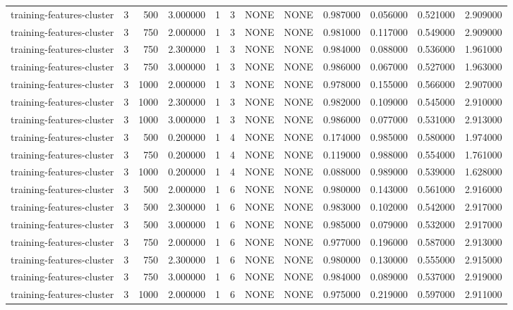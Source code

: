 \begin{tabular}{lrrrllllrrrr}
training-features-cluster & 3 & 500 & 3.000000 & 1 & 3 & NONE & NONE & 0.987000 & 0.056000 & 0.521000 & 2.909000 \\
training-features-cluster & 3 & 750 & 2.000000 & 1 & 3 & NONE & NONE & 0.981000 & 0.117000 & 0.549000 & 2.909000 \\
training-features-cluster & 3 & 750 & 2.300000 & 1 & 3 & NONE & NONE & 0.984000 & 0.088000 & 0.536000 & 1.961000 \\
training-features-cluster & 3 & 750 & 3.000000 & 1 & 3 & NONE & NONE & 0.986000 & 0.067000 & 0.527000 & 1.963000 \\
training-features-cluster & 3 & 1000 & 2.000000 & 1 & 3 & NONE & NONE & 0.978000 & 0.155000 & 0.566000 & 2.907000 \\
training-features-cluster & 3 & 1000 & 2.300000 & 1 & 3 & NONE & NONE & 0.982000 & 0.109000 & 0.545000 & 2.910000 \\
training-features-cluster & 3 & 1000 & 3.000000 & 1 & 3 & NONE & NONE & 0.986000 & 0.077000 & 0.531000 & 2.913000 \\
training-features-cluster & 3 & 500 & 0.200000 & 1 & 4 & NONE & NONE & 0.174000 & 0.985000 & 0.580000 & 1.974000 \\
training-features-cluster & 3 & 750 & 0.200000 & 1 & 4 & NONE & NONE & 0.119000 & 0.988000 & 0.554000 & 1.761000 \\
training-features-cluster & 3 & 1000 & 0.200000 & 1 & 4 & NONE & NONE & 0.088000 & 0.989000 & 0.539000 & 1.628000 \\
training-features-cluster & 3 & 500 & 2.000000 & 1 & 6 & NONE & NONE & 0.980000 & 0.143000 & 0.561000 & 2.916000 \\
training-features-cluster & 3 & 500 & 2.300000 & 1 & 6 & NONE & NONE & 0.983000 & 0.102000 & 0.542000 & 2.917000 \\
training-features-cluster & 3 & 500 & 3.000000 & 1 & 6 & NONE & NONE & 0.985000 & 0.079000 & 0.532000 & 2.917000 \\
training-features-cluster & 3 & 750 & 2.000000 & 1 & 6 & NONE & NONE & 0.977000 & 0.196000 & 0.587000 & 2.913000 \\
training-features-cluster & 3 & 750 & 2.300000 & 1 & 6 & NONE & NONE & 0.980000 & 0.130000 & 0.555000 & 2.915000 \\
training-features-cluster & 3 & 750 & 3.000000 & 1 & 6 & NONE & NONE & 0.984000 & 0.089000 & 0.537000 & 2.919000 \\
training-features-cluster & 3 & 1000 & 2.000000 & 1 & 6 & NONE & NONE & 0.975000 & 0.219000 & 0.597000 & 2.911000 \\

\end{tabular}
